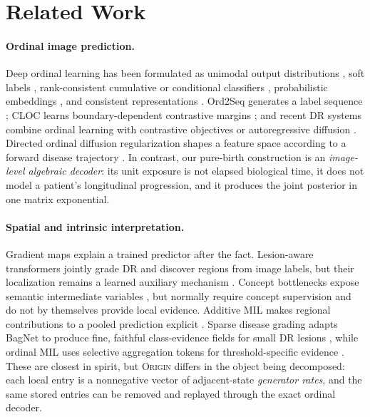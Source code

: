 \documentclass[10pt,twocolumn,letterpaper]{article}
\newcommand{\method}{\textsc{Origin}\xspace}
\begin{document}
\section{Related Work}
\label{sec:related}

\paragraph{Ordinal image prediction.}
Deep ordinal learning has been formulated as unimodal output distributions
\cite{beckham2017unimodal}, soft labels \cite{diaz2019sord}, rank-consistent
cumulative or conditional classifiers \cite{cao2020coral,shi2023corn,
jenkinson2021condor}, probabilistic
embeddings \cite{li2021poe}, and consistent representations
\cite{lei2024core}.  Ord2Seq generates a label sequence
\cite{wang2023ord2seq}; CLOC learns boundary-dependent contrastive margins
\cite{pitawela2025cloc}; and recent DR systems combine ordinal learning with
contrastive objectives \cite{saleem2025hybrid} or autoregressive diffusion
\cite{yu2025aordr}.  Directed ordinal diffusion regularization shapes a feature
space according to a forward disease trajectory \cite{chen2026dodr}.  In
contrast, our pure-birth construction is an \emph{image-level algebraic
decoder}: its unit exposure is not elapsed biological time, it does not model a
patient's longitudinal progression, and it produces the joint posterior in one
matrix exponential.

\paragraph{Spatial and intrinsic interpretation.}
Gradient maps \cite{selvaraju2017gradcam} explain a trained predictor after the
fact.  Lesion-aware transformers jointly grade DR and discover regions from
image labels, but their localization remains a learned auxiliary mechanism
\cite{sun2021lat}.  Concept bottlenecks expose semantic intermediate variables
\cite{koh2020cbm}, but normally require concept supervision and do not by
themselves provide local evidence.  Additive MIL makes regional contributions
to a pooled prediction explicit \cite{javed2022additive}.  Sparse disease
grading adapts BagNet to produce fine, faithful class-evidence fields for small
DR lesions \cite{donteu2024sparse}, while ordinal MIL uses selective
aggregation tokens for threshold-specific evidence \cite{shiku2025satomil}.
These are closest in spirit, but \method differs in the object being
decomposed: each local entry is a nonnegative vector of adjacent-state
\emph{generator rates}, and the same stored entries can be removed and replayed
through the exact ordinal decoder.
\end{document}
